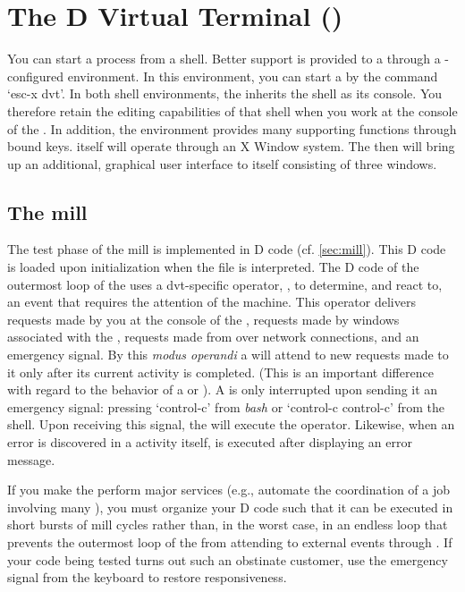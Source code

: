 \newpage


\section{The  D Virtual Terminal ()}\label{sec:dvt}

You can start a  process from a shell. Better support is
provided to a  through a -configured
 environment. In this environment, you can start a
 by the  command `esc-x dvt'. In both shell
environments, the  inherits the shell as its console. You
therefore retain the editing capabilities of that shell when you work
at the console of the . In addition, the 
environment provides many  supporting functions through
bound keys.  itself will operate through an X Window
system. The  then will bring up an additional, graphical
user interface to itself consisting of three  windows.

\subsection{The  mill}

The test phase of the  mill is implemented in D code
(cf. \ref{sec:mill}). This D code is loaded upon initialization when
the file  is interpreted. The D code of the
outermost loop of the  uses a dvt-specific operator,
, to determine, and react to, an event that requires the
attention of the machine. This operator delivers requests made by you
at the console of the , requests made by windows associated
with the , requests made from  over
network connections, and an emergency signal. By this \emph{modus
  operandi} a  will attend to new requests made to it only
after its current activity is completed. (This is an important
difference with regard to the behavior of a  or
). A  is only interrupted upon sending it an
emergency signal: pressing `control-c' from \emph{bash} or `control-c
control-c' from the  shell. Upon receiving this signal,
the  will execute the  operator. Likewise, when
an error is discovered in a  activity itself,  is
executed after displaying an error message.

If you make the  perform major services (e.g., automate the
coordination of a job involving many ), you must
organize your D code such that it can be executed in short bursts of
mill cycles rather than, in the worst case, in an endless loop that
prevents the outermost loop of the  from attending to
external events through . If your  code being
tested turns out such an obstinate customer, use the emergency signal
from the keyboard to restore  responsiveness.

